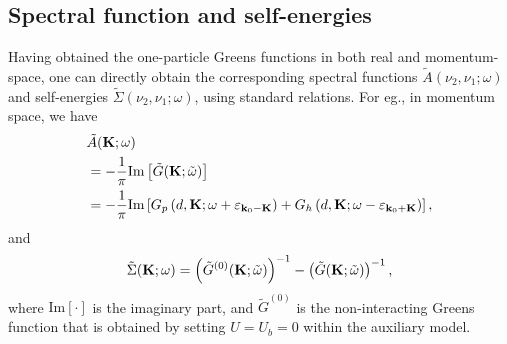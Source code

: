 \documentclass[reprint,hidelinks]{revtex4-2}
\begin{document}
\subsection{Spectral function and self-energies}
Having obtained the one-particle Greens functions in both real and momentum-space, one can directly obtain the corresponding spectral functions \(\tilde A(\nu_2,\nu_1; \omega)\) and self-energies \(\tilde \Sigma(\nu_2,\nu_1; \omega)\), using standard relations. For eg., in momentum space, we have
\begin{equation}\begin{aligned}
	&\tilde A({\bf K}; \omega) \\
	&= -\frac{1}{\pi}\text{Im}\left[\tilde G({\bf K}; \tilde\omega)\right]  \\
	&= -\frac{1}{\pi}\text{Im}\left[G_p\left(d, {\bf K}; \omega + \varepsilon_{{\bf k}_0 - {\bf K}}\right) + G_h\left(d, {\bf K}; \omega - \varepsilon_{{\bf k}_0 + {\bf K}}\right)\right],\\
\end{aligned}\end{equation}
and
\begin{equation}\begin{aligned}
	\tilde \Sigma({\bf K}; \omega) = \left(\tilde G^{(0)}({\bf K}; \tilde\omega)\right)^{-1} - \left(\tilde G({\bf K}; \tilde\omega)\right)^{-1},
\end{aligned}\end{equation}
where \(\text{Im}[\cdot]\) is the imaginary part, and \(\tilde G^{(0)}\) is the non-interacting Greens function that is obtained by setting \(U = U_b = 0\) within the auxiliary model.

\end{document}
